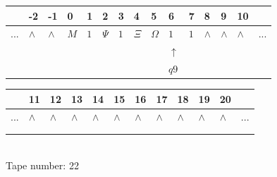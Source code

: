 \documentclass[11pt]{article}
\begin{document}
\begin{table}[H]
\centering
\begin{tabular}{lllllllllllllll}
 & -2 & -1 & 0 & 1 & 2 & 3 & 4 & 5 & 6 & 7 & 8 & 9 & 10 & \\
\hline
$...$ & \multicolumn{1}{|l|}{$\wedge$} & \multicolumn{1}{|l|}{$\wedge$} & \multicolumn{1}{|l|}{$M$} & \multicolumn{1}{|l|}{$1$} & \multicolumn{1}{|l|}{$\Psi$} & \multicolumn{1}{|l|}{$1$} & \multicolumn{1}{|l|}{$\Xi$} & \multicolumn{1}{|l|}{$\Omega$} & \multicolumn{1}{|l|}{$1$} & \multicolumn{1}{|l|}{$1$} & \multicolumn{1}{|l|}{$\wedge$} & \multicolumn{1}{|l|}{$\wedge$} & \multicolumn{1}{|l|}{$\wedge$} & $...$\\
\hline
&  &  &  &  &  &  &  &  & $\uparrow$ &  &  &  &  &  \\
&  &  &  &  &  &  &  &  & $ q9 $ &  &  &  &  &  \\
\end{tabular}
\begin{tabular}{llllllllllll}
 & 11 & 12 & 13 & 14 & 15 & 16 & 17 & 18 & 19 & 20 & \\
\hline
$...$ & \multicolumn{1}{|l|}{$\wedge$} & \multicolumn{1}{|l|}{$\wedge$} & \multicolumn{1}{|l|}{$\wedge$} & \multicolumn{1}{|l|}{$\wedge$} & \multicolumn{1}{|l|}{$\wedge$} & \multicolumn{1}{|l|}{$\wedge$} & \multicolumn{1}{|l|}{$\wedge$} & \multicolumn{1}{|l|}{$\wedge$} & \multicolumn{1}{|l|}{$\wedge$} & \multicolumn{1}{|l|}{$\wedge$} & $...$\\
\hline
&  &  &  &  &  &  &  &  &  &  &  \\
&  &  &  &  &  &  &  &  &  &  &  \\
\end{tabular}
\\
Tape number: 22
\noindent\makebox[\linewidth]{\hdashrule{\textwidth}{1pt}{1pt}}\end{table}
\end{document}
